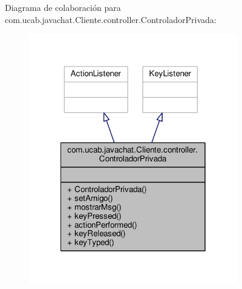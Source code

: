 Diagrama de colaboración para com.\-ucab.\-javachat.\-Cliente.\-controller.\-Controlador\-Privada\-:\nopagebreak
\begin{figure}[H]
\begin{center}
\leavevmode
\includegraphics[width=258pt]{classcom_1_1ucab_1_1javachat_1_1_cliente_1_1controller_1_1_controlador_privada__coll__graph}
\end{center}
\end{figure}

